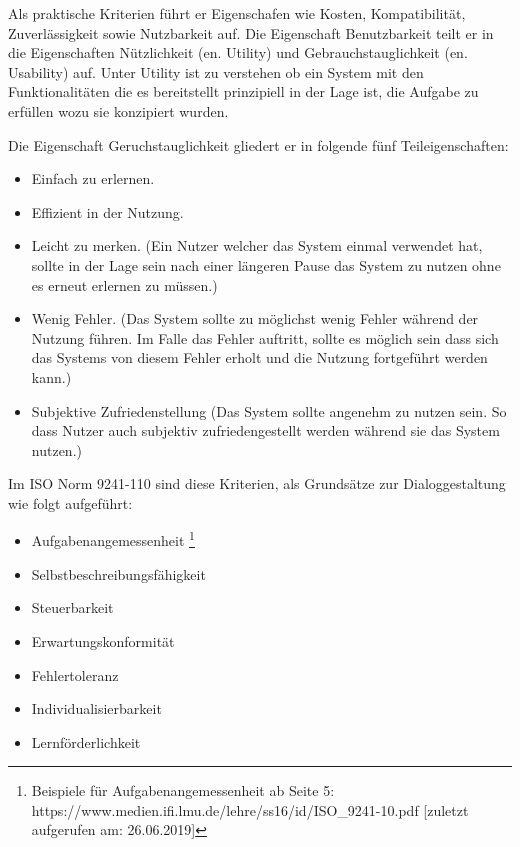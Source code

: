 
Als praktische Kriterien führt er Eigenschafen wie Kosten, Kompatibilität, Zuverlässigkeit sowie Nutzbarkeit auf. Die Eigenschaft Benutzbarkeit teilt er in die Eigenschaften Nützlichkeit (en. Utility) und Gebrauchstauglichkeit (en. Usability) auf. Unter Utility ist zu verstehen ob ein System mit den Funktionalitäten die es bereitstellt prinzipiell in der Lage ist, die Aufgabe zu erfüllen wozu sie konzipiert wurden.

Die Eigenschaft Geruchstauglichkeit gliedert er in folgende fünf Teileigenschaften: 

\begin{itemize}
	\item Einfach zu erlernen.
	\item Effizient in der Nutzung.
	\item Leicht zu merken. (Ein Nutzer welcher das System einmal verwendet hat, sollte in der Lage sein nach einer längeren Pause das System zu nutzen ohne es erneut erlernen zu müssen.)
	\item Wenig Fehler. (Das System sollte zu möglichst wenig Fehler während der Nutzung führen. Im Falle das Fehler auftritt, sollte es möglich sein dass sich das Systems von diesem Fehler erholt und die Nutzung fortgeführt werden kann.)
	\item Subjektive Zufriedenstellung (Das System sollte angenehm zu nutzen sein. So dass Nutzer auch subjektiv zufriedengestellt werden während sie das System nutzen.)
\end{itemize}

Im ISO Norm  9241-110 sind diese Kriterien, als Grundsätze zur Dialoggestaltung wie folgt aufgeführt:

\begin{itemize}
	\item Aufgabenangemessenheit \footnote{Beispiele für Aufgabenangemessenheit ab Seite 5: https://www.medien.ifi.lmu.de/lehre/ss16/id/ISO\_9241-10.pdf [zuletzt aufgerufen am: 26.06.2019]}
	\item Selbstbeschreibungsfähigkeit
	\item Steuerbarkeit
	\item Erwartungskonformität
	\item Fehlertoleranz
	\item Individualisierbarkeit
	\item Lernförderlichkeit
\end{itemize}


